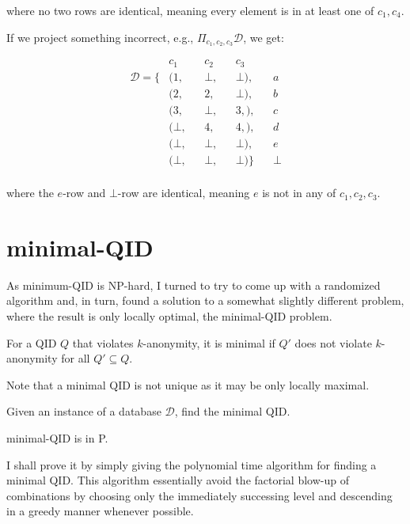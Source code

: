 \documentclass[12pt]{llncs}
\newcommand{\cD}{\mathcal{D}}
\begin{document}
where no two rows are identical, meaning every element is in at least one of $c_1,c_4$.

If we project something incorrect, e.g., $\Pi_{c_1,c_2,c_3} \mathcal{D}$, we get:

\begin{align*}
                 &  c_1   && c_2   && c_3     &&\\
\mathcal{D} = \{ & (1,    && \bot, && \bot),  && a\\
                 & (2,    && 2,    && \bot),  && b\\
                 & (3,    && \bot, && 3,  ),  && c\\
                 & (\bot, && 4,    && 4,  ),  && d\\
                 & (\bot, && \bot, && \bot),  && e\\
                 & (\bot, && \bot, && \bot)\} && \bot\\
\end{align*}

where the $e$-row and $\bot$-row are identical, meaning $e$ is not in any of $c_1,c_2,c_3$.

\section{minimal-QID}
As minimum-QID is NP-hard, I turned to try to come up with a randomized algorithm and, in turn, found a solution to a somewhat slightly different problem, where the result is only locally optimal, the minimal-QID problem.

\begin{definition}
For a QID $Q$ that violates $k$-anonymity, it is minimal if $Q'$ does not violate $k$-anonymity for all $Q' \subseteq Q$.
\end{definition}

Note that a minimal QID is not unique as it may be only locally maximal.

\begin{problem}
Given an instance of a database $\cD$, find the minimal QID.
\end{problem}

\begin{proposition}
minimal-QID is in P.
\end{proposition}

I shall prove it by simply giving the polynomial time algorithm for finding a minimal QID. This algorithm essentially avoid the factorial blow-up of combinations by choosing only the immediately successing level and descending in a greedy manner whenever possible.
\end{document}
